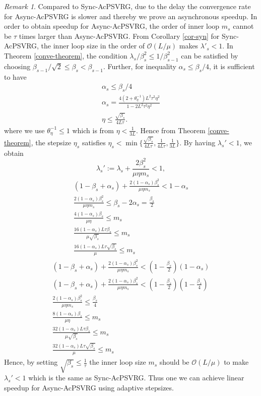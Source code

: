 \documentclass{article}
\theoremstyle{definition}
\theoremstyle{remark}
\newtheorem{remark}[theorem]{Remark}
\begin{document}
\begin{remark}
Compared to Sync-AcPSVRG, due to the delay the convergence rate for Async-AcPSVRG is slower and thereby we prove an asynchronous speedup. In order to obtain speedup for Async-AcPSVRG, the order of inner loop $m_s$ cannot be $\tau$ times larger than Async-AcPSVRG. From Corollary \ref{cor-syn} for Sync-AcPSVRG, the inner loop size in the order of $\mathcal{O}(L/\mu)$ makes $\lambda'_s<1$. In Theorem \ref{conve-theorem}, the condition $\lambda_s/\beta_s^2 \leq 1/\beta_{s-1}^2$ can be satisfied by choosing $\beta_{s-1}/\sqrt{2}\leq \beta_s < \beta_{s-1}$. Further, for inequality $\alpha_s\leq \beta_s/4$, it is sufficient to have 
\begin{equation}
\begin{split}
\alpha_s\leq \beta_s/4\\
\alpha_s=\frac{4(2+\theta_{\eta}^{-1})L^2\tau^2\eta^2}{1-2L^2 \tau^2\eta^2}\\
\eta \leq \frac{\sqrt{\beta_s}}{4L\tau}.
\end{split}
\end{equation}
where we use  $\theta_\eta^{-1} \leq 1$ which is from $\eta< \frac{1}{3L}$.
Hence from Theorem \ref{conve-theorem}, the stepsize $\eta_s$ satisfies $\eta_s<\min\{\frac{\sqrt{\beta_s}}{4L\tau},\frac{1}{4L
\tau}, \frac{1}{3L}\}$. By having $\lambda_s'<1$, we obtain 
\[
\lambda_s' := \lambda_s+{\frac{2 \beta_s^2}{\mu\eta m_s}} < 1,
\]
\begin{equation}
\begin{split}
(1-\beta_s+\alpha_s)+\frac{2(1-\alpha_s)\beta_s^2}{\mu\eta m_s} < 1-\alpha_s\\
\frac{2(1-\alpha_s)\beta_s^2}{\mu\eta m_s} \leq \beta_s-2\alpha_s=\frac{\beta_s}{2}\\
\frac{4(1-\alpha_s)\beta_s}{\mu\eta} \leq m_s\\
\frac{16(1-\alpha_s)L\tau\beta_s}{\mu\sqrt{\beta_s}} \leq m_s\\
\frac{16(1-\alpha_s)L\tau\sqrt{\beta_s}}{\mu} \leq m_s
\end{split}
\end{equation}
{\color{blue}
\begin{equation}
\begin{split}
(1-\beta_s+\alpha_s)+\frac{2(1-\alpha_s)\beta_s^2}{\mu\eta m_s} < (1-\frac{\beta_s}{2})(1-\alpha_s)\\
(1-\beta_s+\alpha_s)+\frac{2(1-\alpha_s)\beta_s^2}{\mu\eta m_s} < (1-\frac{\beta_s}{2})(1-\frac{\beta_s}{4})\\
\frac{2(1-\alpha_s)\beta_s^2}{\mu\eta m_s} \leq \frac{\beta_s}{4}\\
\frac{8(1-\alpha_s)\beta_s}{\mu\eta} \leq m_s\\
\frac{32(1-\alpha_s)L\tau\beta_s}{\mu\sqrt{\beta_s}} \leq m_s\\
\frac{32(1-\alpha_s)L\tau\sqrt{\beta_s}}{\mu} \leq m_s
\end{split}
\end{equation}
}
Hence, by setting $\sqrt{\beta_s}\leq \frac{1}{\tau}$ the inner loop size $m_s$ should be $\mathcal{O}(L/\mu)$ to make $\lambda_s'<1$ which is the same as Sync-AcPSVRG. Thus one we can achieve linear speedup for Async-AcPSVRG using adaptive stepsizes.
\end{remark}
\end{document}
